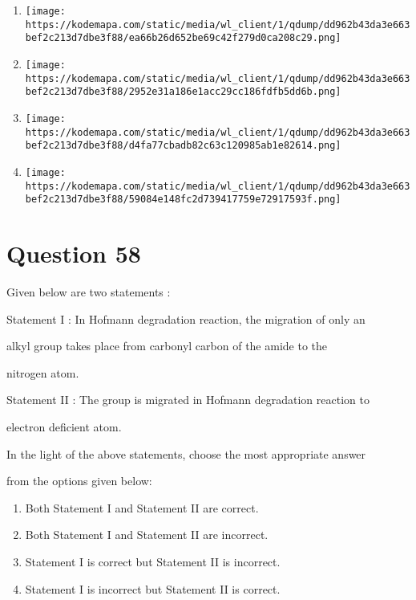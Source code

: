\documentclass{article}
\begin{document}
\begin{enumerate}[label=(\alph*)]
\item \texttt{[image: https://kodemapa.com/static/media/wl\_client/1/qdump/dd962b43da3e663bef2c213d7dbe3f88/ea66b26d652be69c42f279d0ca208c29.png]}


\item \texttt{[image: https://kodemapa.com/static/media/wl\_client/1/qdump/dd962b43da3e663bef2c213d7dbe3f88/2952e31a186e1acc29cc186fdfb5dd6b.png]}


\item \texttt{[image: https://kodemapa.com/static/media/wl\_client/1/qdump/dd962b43da3e663bef2c213d7dbe3f88/d4fa77cbadb82c63c120985ab1e82614.png]}


\item \texttt{[image: https://kodemapa.com/static/media/wl\_client/1/qdump/dd962b43da3e663bef2c213d7dbe3f88/59084e148fc2d739417759e72917593f.png]}


\end{enumerate}
\newpage
\section*{Question 58}
Given below are two statements :



Statement I : In Hofmann degradation reaction, the migration of only an

alkyl group takes place from carbonyl carbon of the amide to the

nitrogen atom.



Statement II : The group is migrated in Hofmann degradation reaction to

electron deficient atom.



In the light of the above statements, choose the most appropriate answer

from the options given below:


\begin{enumerate}[label=(\alph*)]
\item Both Statement I and Statement II are correct.


\item Both Statement I and Statement II are incorrect.


\item Statement I is correct but Statement II is incorrect.


\item Statement I is incorrect but Statement II is correct.


\end{enumerate}
\newpage
\end{document}
